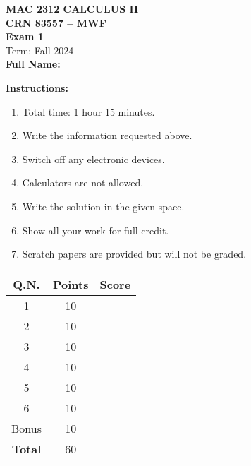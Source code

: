 \documentclass[12pt]{article}
\begin{document}
\begin{center}
    \textbf{\Large MAC 2312 CALCULUS II} \\
    \textbf{CRN 83557 – MWF} \\
    \vspace{0.2cm}
    \textbf{\Large Exam 1} \\
    \vspace{0.2cm}
    Term: Fall 2024 \\
    \vspace{0.3cm}
    \textbf{Full Name: \underline{\hspace{8cm}}}
\end{center}

\vspace{0.5cm}

\textbf{Instructions:}
\begin{enumerate}
    \item Total time: 1 hour 15 minutes.
    \item Write the information requested above.
    \item Switch off any electronic devices.
    \item Calculators are not allowed.
    \item Write the solution in the given space.
    \item Show all your work for full credit.
    \item Scratch papers are provided but will not be graded.
\end{enumerate}

\vspace{0.5cm}

\begin{tabular}{|c|c|c|}
    \hline
    \textbf{Q.N.} & \textbf{Points} & \textbf{Score} \\
    \hline
    1 & 10 & \\
    2 & 10 & \\
    3 & 10 & \\
    4 & 10 & \\
    5 & 10 & \\
    6 & 10 & \\
    Bonus & 10 & \\
    \hline
    \textbf{Total} & 60 & \\
    \hline
\end{tabular}

\vspace{1cm}
\end{document}
